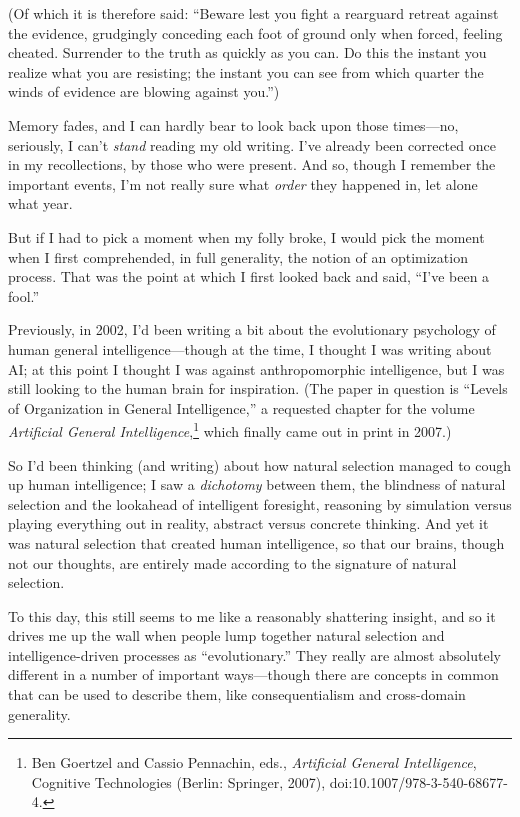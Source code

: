 {
 (Of which it is therefore said: ``Beware lest you
fight a rearguard retreat against the evidence, grudgingly conceding
each foot of ground only when forced, feeling cheated. Surrender to the
truth as quickly as you can. Do this the instant you realize what you
are resisting; the instant you can see from which quarter the winds of
evidence are blowing against you.'')}

{
 Memory fades, and I can hardly bear to look back upon those
times---no, seriously, I can't \textit{stand} reading
my old writing. I've already been corrected once in my
recollections, by those who were present. And so, though I remember the
important events, I'm not really sure what
\textit{order} they happened in, let alone what year.}

{
 But if I had to pick a moment when my folly broke, I would pick
the moment when I first comprehended, in full generality, the notion of
an optimization process. That was the point at which I first looked
back and said, ``I've been a
fool.''}

{
 Previously, in 2002, I'd been writing a bit about
the evolutionary psychology of human general intelligence---though at
the time, I thought I was writing about AI; at this point I thought I
was against anthropomorphic intelligence, but I was still looking to
the human brain for inspiration. (The paper in question is
``Levels of Organization in General
Intelligence,'' a requested chapter for the volume
\textit{Artificial General Intelligence},\footnote{Ben Goertzel and Cassio Pennachin, eds., \textit{Artificial
General Intelligence}, Cognitive Technologies (Berlin: Springer, 2007),
doi:10.1007/978-3-540-68677-4.} which
finally came out in print in 2007.)}

{
 So I'd been thinking (and writing) about how
natural selection managed to cough up human intelligence; I saw a
\textit{dichotomy} between them, the blindness of natural selection and
the lookahead of intelligent foresight, reasoning by simulation versus
playing everything out in reality, abstract versus concrete thinking.
And yet it was natural selection that created human intelligence, so
that our brains, though not our thoughts, are entirely made according
to the signature of natural selection.}

{
 To this day, this still seems to me like a reasonably shattering
insight, and so it drives me up the wall when people lump together
natural selection and intelligence-driven processes as
``evolutionary.'' They really are
almost absolutely different in a number of important ways---though
there are concepts in common that can be used to describe them, like
consequentialism and cross-domain generality.}

